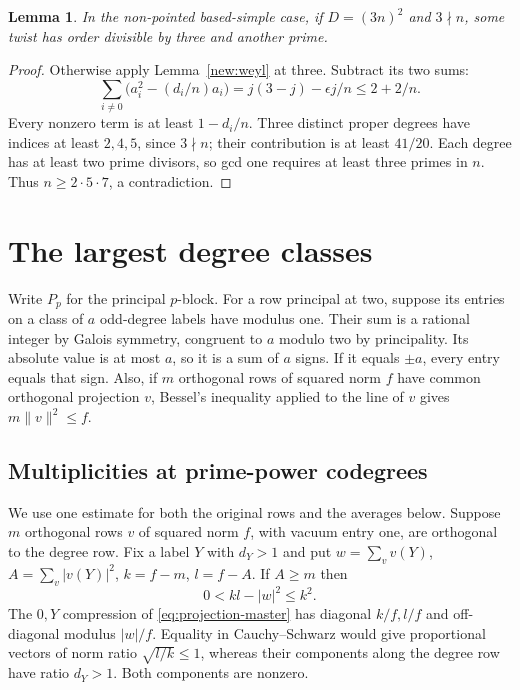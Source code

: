 \documentclass[11pt]{amsart}
\numberwithin{equation}{section}
\newtheorem{lemma}[theorem]{Lemma}
\theoremstyle{definition}
\theoremstyle{plain}
\begin{document}
\begin{lemma}\label{isolated}
In the non-pointed based-simple case, if $D=(3n)^2$ and $3\nmid n$,
some twist has order divisible by three and another prime.
\end{lemma}
\begin{proof}
Otherwise apply Lemma~\ref{new:weyl} at three. Subtract its two sums:
\[
 \sum_{i\ne0}\bigl(a_i^2-(d_i/n)a_i\bigr)
     =j(3-j)-\epsilon j/n\le2+2/n .
\]
Every nonzero term is at least $1-d_i/n$. Three distinct proper
degrees have indices at least $2,4,5$, since $3\nmid n$; their
contribution is at least $41/20$. Each degree has at least two
prime divisors, so gcd one requires at least three primes in $n$.
Thus $n\ge2\cdot5\cdot7$, a contradiction.
\end{proof}

\section{The largest degree classes}\label{sec:large}
Write $P_p$ for the principal $p$-block. For a row principal at two, suppose its entries on a class of $a$ odd-degree
labels have modulus one. Their sum is a rational integer by Galois
symmetry, congruent to $a$ modulo two by principality. Its absolute
value is at most $a$, so it is a sum of $a$ signs. If it equals
$\pm a$, every entry equals that sign. Also, if $m$ orthogonal rows
of squared norm $f$ have common orthogonal projection $v$, Bessel's
inequality applied to the line of $v$ gives $m\|v\|^2\le f$.

\subsection{Multiplicities at prime-power codegrees}
We use one estimate for both the original rows and the averages below.
Suppose $m$ orthogonal rows $v$ of squared norm $f$, with vacuum
entry one, are orthogonal to the degree row. Fix a label $Y$ with
$d_Y>1$ and put $w=\sum_v v(Y)$, $A=\sum_v|v(Y)|^2$, $k=f-m$, $l=f-A$.
If $A\ge m$ then
\begin{equation}\label{eq:saturation-gram}
                       0<kl-|w|^2\le k^2.
\end{equation}
The $0,Y$ compression of \eqref{eq:projection-master} has
diagonal $k/f,l/f$ and off-diagonal modulus $|w|/f$.
Equality in Cauchy--Schwarz would give proportional vectors of norm
ratio $\sqrt{l/k}\le1$, whereas their components along the degree
row have ratio $d_Y>1$. Both components are nonzero.
\end{document}
